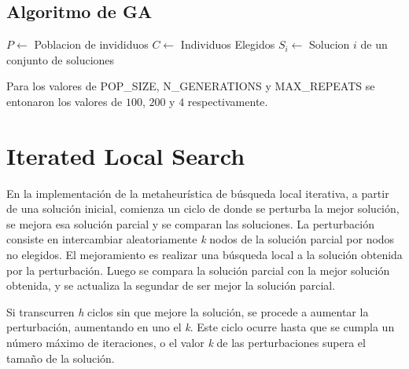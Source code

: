 \documentclass{ci5652}
\begin{document}
\subsection{Algoritmo de GA}
\begin{algorithm}
\DontPrintSemicolon
$P \leftarrow$ Poblacion de invididuos\;
$C \leftarrow$ Individuos Elegidos\;
$S_i \leftarrow$ Solucion $i$ de un conjunto de soluciones\;
\end{algorithm}

Para los valores de POP\_SIZE, N\_GENERATIONS y MAX\_REPEATS se entonaron los valores de $100$, $200$ y $4$ respectivamente.



\section{Iterated Local Search}
En la implementación de la metaheurística de búsqueda local iterativa, a partir de una solución inicial, comienza un ciclo de donde se perturba la mejor solución, se mejora esa solución parcial y se comparan las soluciones. La perturbación consiste en intercambiar aleatoriamente \textit{k} nodos de la solución parcial por nodos no elegidos. El mejoramiento es realizar una búsqueda local a la solución obtenida por la perturbación. Luego se compara la solución parcial con la mejor solución obtenida, y se actualiza la segundar de ser mejor la solución parcial.

Si transcurren \textit{h} ciclos sin que mejore la solución, se procede a aumentar la perturbación, aumentando en uno el \textit{k}. Este ciclo ocurre hasta que se cumpla un número máximo de iteraciones, o el valor \textit{k} de las perturbaciones supera el tamaño de la solución.
\end{document}
